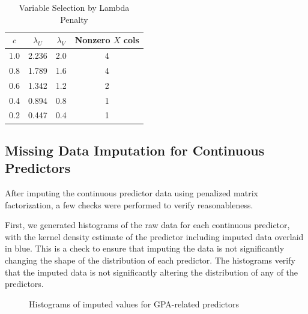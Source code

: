 \documentclass{article}
\begin{document}
\begin{table}[H]
  \caption{Variable Selection by Lambda Penalty}
  \label{sample-table}
  \centering
  \begin{tabular}{cccc}
    \toprule
    $c$   & $\lambda_U$   & $\lambda_V$   &Nonzero $X$ cols \\
    \midrule
    1.0  & 2.236     & 2.0       & 4\\
    0.8  & 1.789     & 1.6       & 4\\
    0.6  & 1.342     & 1.2       & 2\\
    0.4  & 0.894     & 0.8       & 1\\
    0.2  & 0.447     & 0.4       & 1\\
    \bottomrule
  \end{tabular}
\end{table}

\subsection{Missing Data Imputation for Continuous Predictors}

After imputing the continuous predictor data using penalized matrix factorization, a few checks were performed to verify reasonableness.

First, we generated histograms of the raw data for each continuous predictor, with the kernel density estimate of the predictor including imputed data overlaid in blue.  This is a check to ensure that imputing the data is not significantly changing the shape of the distribution of each predictor. The histograms verify that the imputed data is not significantly altering the distribution of any of the predictors.

\begin{figure}[htp!]
  \centering
  \caption{Histograms of imputed values for GPA-related predictors \label{fig:1}}
\end{figure}
\end{document}
